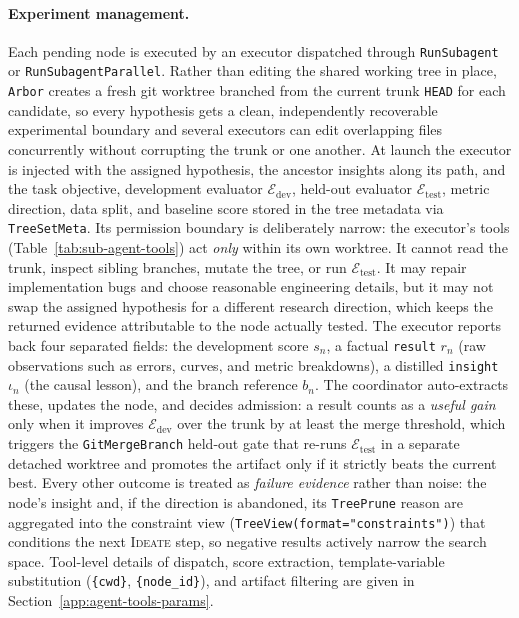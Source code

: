 \documentclass{llmxive}
\providecommand{\arbor}{\texttt{Arbor}}
\providecommand{\Eval}{\mathcal{E}}
\providecommand{\dev}{\mathrm{dev}}
\providecommand{\test}{\mathrm{test}}
\begin{document}
\paragraph{Experiment management.}
Each pending node is executed by an executor dispatched through
\texttt{RunSubagent} or \texttt{RunSubagentParallel}. Rather than editing the
shared working tree in place, \arbor{} creates a fresh git worktree branched
from the current trunk \texttt{HEAD} for each candidate, so every hypothesis gets
a clean, independently recoverable experimental boundary and several executors
can edit overlapping files concurrently without corrupting the trunk or one
another. At launch the executor is injected with the assigned hypothesis, the
ancestor insights along its path, and the task
objective, development evaluator $\Eval_\dev$, held-out evaluator $\Eval_\test$,
metric direction, data split, and baseline score stored in the tree metadata
via \texttt{TreeSetMeta}. Its permission boundary is deliberately narrow: the
executor's tools (Table~\ref{tab:sub-agent-tools}) act \emph{only} within its
own worktree. It cannot read the trunk, inspect sibling branches, mutate the
tree, or run $\Eval_\test$. It may repair implementation bugs and choose
reasonable engineering details, but it may not swap the assigned hypothesis for
a different research direction, which keeps the returned evidence attributable
to the node actually tested. The executor reports back four separated fields:
the development score $s_n$, a factual \texttt{result} $r_n$ (raw observations
such as errors, curves, and metric breakdowns), a distilled \texttt{insight}
$\iota_n$ (the causal lesson), and the branch reference $b_n$. The coordinator
auto-extracts these, updates the node, and decides admission: a result counts as
a \emph{useful gain} only when it improves $\Eval_\dev$ over the trunk by at
least the merge threshold, which triggers the \texttt{GitMergeBranch} held-out
gate that re-runs $\Eval_\test$ in a separate detached worktree and promotes the
artifact only if it strictly beats the current best. Every other outcome is
treated as \emph{failure evidence} rather than noise: the node's insight and, if
the direction is abandoned, its \texttt{TreePrune} reason are aggregated into
the constraint view (\texttt{TreeView(format="constraints")}) that conditions
the next \textsc{Ideate} step, so negative results actively narrow the search
space. Tool-level details of dispatch, score extraction, template-variable
substitution (\texttt{\{cwd\}}, \texttt{\{node\_id\}}), and artifact filtering
are given in Section~\ref{app:agent-tools-params}.
\end{document}
